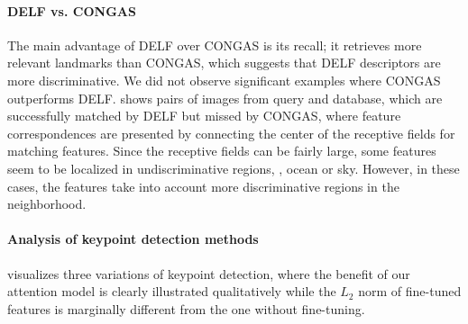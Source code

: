 \documentclass[10pt,twocolumn,letterpaper]{article}
\begin{document}
\vspace{-3pt}
\paragraph{DELF vs. CONGAS}
\iffalse
\figref{fig:feat_matches} presents query-database pairs which are successful DELF matches, missed by CONGAS.
DELF's main improvement over CONGAS is in terms of recall: it is able to retrieve many more relevant landmarks compared to CONGAS.
This suggests that DELF descriptors are more discriminative.
We did not observe significant examples where CONGAS outperforms DELF, so we do not include such examples here.

In \figref{fig:feat_matches}, we present feature correspondences by connecting the center of the receptive fields for matching features.
Note that the receptive fields can be quite large.
This explains why some features seem to be localized in undiscriminative regions (\eg, in the ocean or in the sky) -- in these cases, the features are extracted from large patches, which take into account more discriminative regions in its neighborhood.
\fi
The main advantage of DELF over CONGAS is its recall; it retrieves more relevant landmarks than CONGAS, which suggests that DELF descriptors are more discriminative.
We did not observe significant examples where CONGAS outperforms DELF.
 shows pairs of images from query and database, which are successfully matched by DELF but missed by CONGAS, where feature correspondences are presented by connecting the center of the receptive fields for matching features.
Since the receptive fields can be fairly large, some features seem to be localized in undiscriminative regions, \eg, ocean or sky.
However, in these cases, the features take into account more discriminative regions in the neighborhood.


\vspace{-7pt}
\paragraph{Analysis of keypoint detection methods}
 visualizes three variations of keypoint detection, where the benefit of our attention model is clearly illustrated qualitatively while the $L_2$ norm of fine-tuned features is marginally different from the one without fine-tuning.



\iffalse
\end{document}
